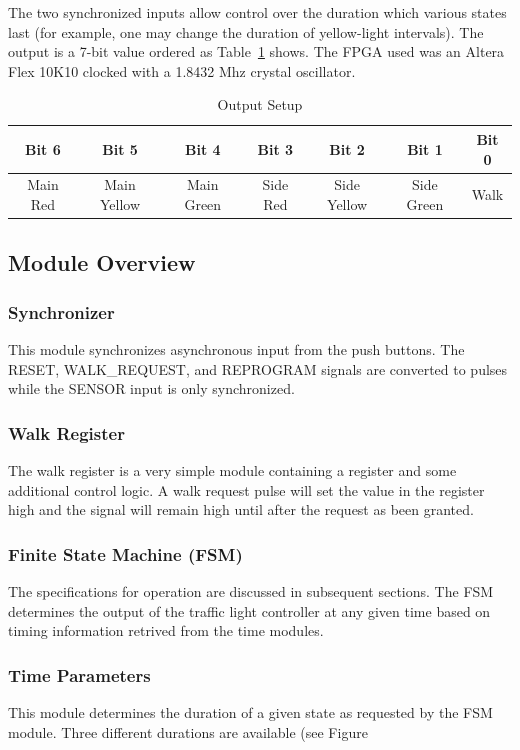 \documentclass{article}
\begin{document}
		The two synchronized inputs allow control over the duration which
		various states last (for example, one may change the duration of
		yellow-light intervals).  The output is a 7-bit value ordered as
		Table~\ref{tbl:output} shows.  The FPGA used was an Altera Flex 10K10
		clocked with a 1.8432 Mhz crystal oscillator.
		\begin{table}
		\centering
			\begin{tabular}{|c|c|c|c|c|c|c|}
			\hline
			Bit 6 & Bit 5 & Bit 4 & Bit 3 & Bit 2 & Bit 1 & Bit 0 \\ \hline
			Main Red & Main Yellow & Main Green & Side Red & Side Yellow & Side Green & Walk \\ \hline
			\end{tabular}
		\caption{Output Setup}
		\label{tbl:output}
		\end{table}
	

	\subsection{Module Overview}
		\subsubsection{Synchronizer}
			This module synchronizes asynchronous input from the
			push buttons.  The RESET, WALK\_REQUEST, and REPROGRAM
			signals are converted to pulses while the SENSOR input
			is only synchronized.

		\subsubsection{Walk Register}
			The walk register is a very simple module containing a
			register and some additional control logic.  A walk
			request pulse will set the value in the register high
			and the signal will remain high until after the request
			as been granted.

		\subsubsection{Finite State Machine (FSM)}
			The specifications for operation are discussed in
			subsequent sections.  The FSM determines the output of the
			traffic light controller at any given time based on
			timing information retrived from the time modules.

		\subsubsection{Time Parameters}
			This module determines the duration of a given state
			as requested by the FSM module.  Three different
			durations are available (see Figure 
\end{document}
